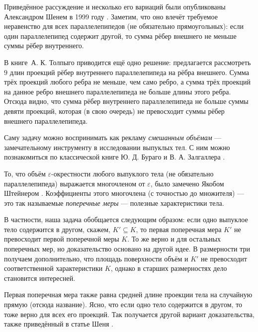 \begin{addedbytheeditors}
Приведённое рассуждение и несколько его вариаций были опубликованы Александром Шенем в 1999 году \cite{shen}.
Заметим, что оно влечёт требуемое неравенство для всех параллелепипедов (не обязательно прямоугольных): если один параллелепипед содержит другой, то сумма рёбер внешнего не меньше суммы рёбер внутреннего.

В книге~А. К. Толпыго \cite{Tolpygo2010} приводится ещё одно решение:
предлагается рассмотреть $9$ длин проекций рёбер внутреннего параллелепипеда на рёбра внешнего.
Сумма трёх проекций любого ребра не меньше, чем само ребро,
а сумма трёх проекций на данное ребро внешнего параллелепипеда не больше длины этого ребра.
Отсюда видно, что сумма рёбер внутреннего параллелепипеда не больше суммы девяти проекций, которая (в свою очередь) не превосходит суммы рёбер внешнего параллелепипеда.

Саму задачу можно воспринимать как рекламу \emph{смешанным объёмам} --- замечательному инструменту в исследовании выпуклых тел.
С ним можно познакомиться по классической книге Ю. Д. Бураго и В. А. Залгаллера \cite{burago-zalgaller}.

То, что объём $\varepsilon$-окрестности любого выпуклого тела (не обязательно параллелепипеда) выражается многочленом от $\varepsilon$, было замечено Якобом Штейнером \cite{steiner}.
Коэффициенты этого многочлена (с точностью до множителя) --- это так называемые \emph{поперечные меры} --- полезные характеристики тела.

В частности, наша задача обобщается следующим образом: если одно выпуклое тело содержится в другом, скажем, $K'\subseteq K$,
то первая поперечная мера $K'$ не превосходит первой поперечной меры $K$.
То же верно и для остальных поперечных мер, но доказательство основано на другой идее.
В размерности три получаем дополнительно, что  площадь поверхности объём и $K'$ не превосходит соответственной характеристики $K$, однако в старших размерностях дело становится интересней.

Первая поперечная мера также равна средней длине проекции тела на случайную прямую (отсюда название).
Ясно, что если одно тело содержится в другом, то тоже верно для всех его проекций.
Так получается другой вариант доказательства, также приведённый в статье Шеня \cite{shen}.
\pr
\end{addedbytheeditors}


